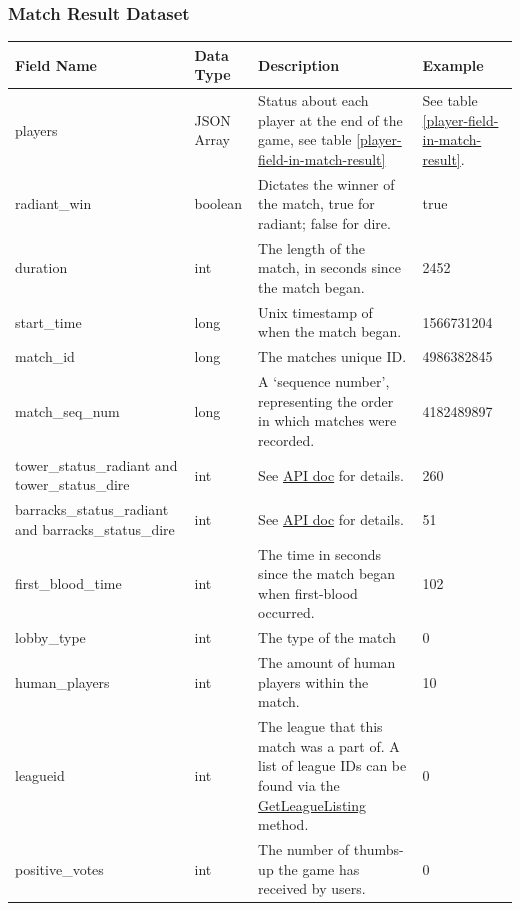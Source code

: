 \documentclass{article}
\begin{document}
\subsubsection{Match Result Dataset}

\begin{longtable}{|p{2.5cm}|p{2cm}|p{5.5cm}|p{3cm}|}

\hline
\textbf{Field Name} & \textbf{Data Type} & \textbf{Description}  & \textbf{Example}\\
\hline
\endhead

players & JSON Array  & Status about each player at the end of the game, see table \ref{player-field-in-match-result} & See table \ref{player-field-in-match-result}.
\\
\hline
radiant\_win & boolean  & Dictates the winner of the match, true for radiant; false for dire. &true \\
\hline
duration  & int  & The length of the match, in seconds since the match began.  & 2452 \\
\hline
start\_time  & long  & Unix timestamp of when the match began.  & 1566731204 \\
\hline
match\_id  & long  & The matches unique ID.  & 4986382845 \\
\hline
match\_seq\_num  & long  & A `sequence number', representing the order in which matches were recorded.  & 4182489897 \\
\hline
tower\_status\_radiant and tower\_status\_dire  & int  & See \href{https://wiki.teamfortress.com/wiki/WebAPI/GetMatchDetails\#Tower\_Status}{API doc} for details.  & 260 \\
\hline
barracks\_status\_radiant and barracks\_status\_dire  & int  & See \href{https://wiki.teamfortress.com/wiki/WebAPI/GetMatchDetails\#Barracks\_Status}{API doc} for details. & 51 \\
\hline
first\_blood\_time  & int  & The time in seconds since the match began when first-blood occurred.  & 102 \\
\hline
lobby\_type  & int  & The type of the match  & 0 \\
\hline
human\_players  & int  & The amount of human players within the match.  & 10 \\
\hline
leagueid  & int  & The league that this match was a part of. A list of league IDs can be found via the \href{https://wiki.teamfortress.com/wiki/WebAPI/GetLeagueListing}{GetLeagueListing} method.
  & 0 \\
\hline
positive\_votes  & int  & The number of thumbs-up the game has received by users.  & 0 \\

\end{longtable}
\end{document}
